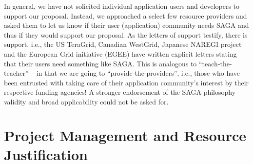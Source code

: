 \documentclass[10pt,letterpaper]{article}
\begin{document}
In general, we have not solicited individual application users and
developers to support our proposal.  Instead, we approached a select
few resource providers and asked them to let us know if their user
(application) community needs SAGA and thus if they would support our
proposal.  As the letters of support testify, there is 
support, i.e., the US TeraGrid, Canadian WestGrid, Japanese NAREGI
project and the European Grid initiative (EGEE) have written explicit
letters stating that their users need something like SAGA. This is
analogous to ``teach-the-teacher'' -- in that we are going to
``provide-the-providers'', i.e., those who have been entrusted with
taking care of their application community's interest by their
respective funding agencies!  A stronger endorsement of the SAGA
philosophy -- validity and broad applicability could not be asked for.




\section{Project Management and Resource Justification}
\end{document}
